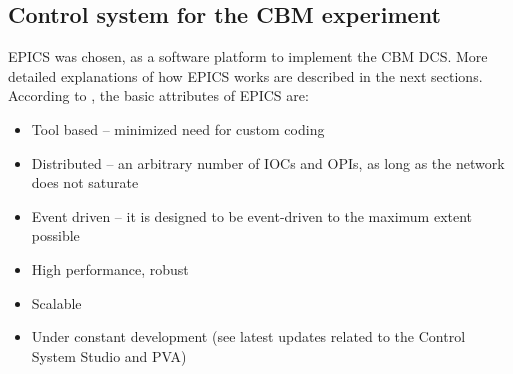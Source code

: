 



\subsection{Control system for the CBM experiment}
\gls{EPICS} was chosen, as a software platform to implement the \gls{CBM} \gls{DCS}. More detailed explanations of how \gls{EPICS} works are described in the next sections. According to \cite{EPICS_DOCS}, the basic attributes of \gls{EPICS} are:
\begin{itemize}
    \item Tool based -- minimized need for custom coding
    \item Distributed -- an arbitrary number of \glspl{IOC} and \glspl{OPI}, as long as the network does not saturate
    \item Event driven -- it is designed to be event-driven to the maximum extent possible
    \item High performance, robust
    \item Scalable
    \item Under constant development (see latest updates related to the Control System Studio and PVA)
\end{itemize}

